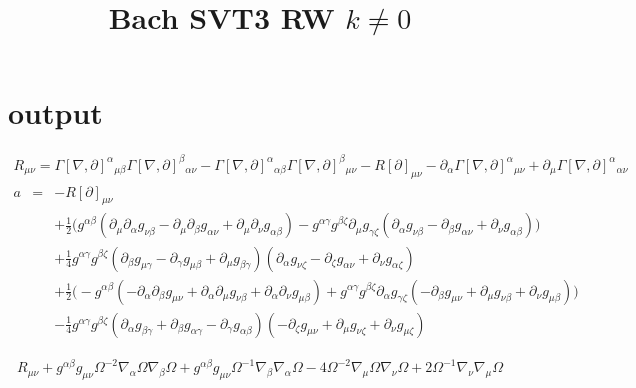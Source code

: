 \documentclass[10pt,letterpaper]{article}
\title{Bach SVT3 RW $k\ne 0$}
\date{}
\numberwithin{equation}{section}
\begin{document}
 
\maketitle
\noindent 
\section{output}
\begin{eqnarray}
R_{\mu\nu} = \Gamma [\nabla ,\partial ]^{\alpha }{}_{\mu \beta } \Gamma [\nabla ,\partial ]^{\beta }{}_{\alpha \nu } -  \Gamma [\nabla ,\partial ]^{\alpha }{}_{\alpha \beta } \Gamma [\nabla ,\partial ]^{\beta }{}_{\mu \nu } -  R[\partial ]_{\mu \nu } -  \partial_{\alpha }\Gamma [\nabla ,\partial ]^{\alpha }{}_{\mu \nu } + \partial_{\mu }\Gamma [\nabla ,\partial ]^{\alpha }{}_{\alpha \nu }
\end{eqnarray}
\begin{eqnarray}
a&=& - R[\partial ]_{\mu \nu } \nonumber \\ 
&& + \tfrac{1}{2} \bigl(g^{\alpha \beta } (\partial_{\mu }\partial_{\alpha }g_{\nu \beta } -  \partial_{\mu }\partial_{\beta }g_{\alpha \nu } + \partial_{\mu }\partial_{\nu }g_{\alpha \beta }) -  g^{\alpha \gamma } g^{\beta \zeta } \partial_{\mu }g_{\gamma \zeta } (\partial_{\alpha }g_{\nu \beta } -  \partial_{\beta }g_{\alpha \nu } + \partial_{\nu }g_{\alpha \beta })\bigr) \nonumber \\ 
&& + \tfrac{1}{4} g^{\alpha \gamma } g^{\beta \zeta } (\partial_{\beta }g_{\mu \gamma } -  \partial_{\gamma }g_{\mu \beta } + \partial_{\mu }g_{\beta \gamma }) (\partial_{\alpha }g_{\nu \zeta } -  \partial_{\zeta }g_{\alpha \nu } + \partial_{\nu }g_{\alpha \zeta }) \nonumber \\ 
&& + \tfrac{1}{2} \bigl(- g^{\alpha \beta } (- \partial_{\alpha }\partial_{\beta }g_{\mu \nu } + \partial_{\alpha }\partial_{\mu }g_{\nu \beta } + \partial_{\alpha }\partial_{\nu }g_{\mu \beta }) + g^{\alpha \gamma } g^{\beta \zeta } \partial_{\alpha }g_{\gamma \zeta } (- \partial_{\beta }g_{\mu \nu } + \partial_{\mu }g_{\nu \beta } + \partial_{\nu }g_{\mu \beta })\bigr) \nonumber \\ 
&& -  \tfrac{1}{4} g^{\alpha \gamma } g^{\beta \zeta } (\partial_{\alpha }g_{\beta \gamma } + \partial_{\beta }g_{\alpha \gamma } -  \partial_{\gamma }g_{\alpha \beta }) (- \partial_{\zeta }g_{\mu \nu } + \partial_{\mu }g_{\nu \zeta } + \partial_{\nu }g_{\mu \zeta })
\end{eqnarray}

\begin{eqnarray}
R_{\mu \nu } + g^{\alpha \beta } g_{\mu \nu } \Omega^{-2} \nabla_{\alpha }\Omega \nabla_{\beta }\Omega + g^{\alpha \beta } g_{\mu \nu } \Omega^{-1} \nabla_{\beta }\nabla_{\alpha }\Omega - 4 \Omega^{-2} \nabla_{\mu }\Omega \nabla_{\nu }\Omega + 2 \Omega^{-1} \nabla_{\nu }\nabla_{\mu }\Omega 
\end{eqnarray}
\end{document}
